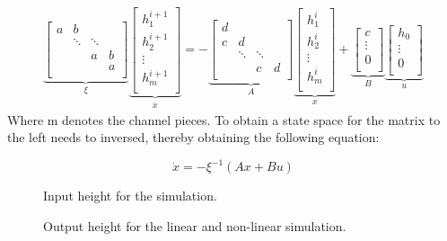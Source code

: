 \begin{equation}
\begin{aligned}
	   \underbrace{\begin{bmatrix}
	    	a & b \\
	    	  & \ddots  & \ddots \\
	    	  &  		& a  		&b\\
	          &  		&  			&  a\\
	   \end{bmatrix}}_{\xi}
	    \underbrace{\begin{bmatrix}
		h_{1}^{i+1} \\
		h_{2}^{i+1}\\
		\vdots		\\
		h_{m}^{i+1}\\
	\end{bmatrix}}_{\dot{x}}
	= -
	\underbrace{\begin{bmatrix}
	    	d &  \\
	    	c & d & \\
	    	  &	\ddots  & \ddots   \\
	    	  &   &  c &  d\\
	    \end{bmatrix}}_{A}
	    	\underbrace{\begin{bmatrix}
		h_{1}^{i} \\
		h_{2}^{i}\\
		\vdots		\\
		h_{m}^{i}\\
		\end{bmatrix}}_{x}
	+ \underbrace{\begin{bmatrix}
		c \\
		\vdots		\\
		0\\
		\end{bmatrix}}_{B}
		\underbrace{\begin{bmatrix}
		h_{0} \\
		\vdots		\\
		0\\
		\end{bmatrix}}_{u}
	\end{aligned}
\end{equation}
Where m denotes the channel pieces.  
To obtain a state space for the matrix to the left needs to inversed, thereby obtaining the following equation:

\begin{equation}
	\dot{x} = -\xi^{-1} (Ax+Bu)
\end{equation}



\begin{figure}[H]
 \centering
 
\caption{Input height for the simulation.}
\label{fig:height_input_for_comparision}
\end{figure}

\begin{figure}[H]
 \centering
 
\caption{Output height for the linear and non-linear simulation.}
\label{fig:height_output_nonlinear_and_linear_model}
\end{figure}
